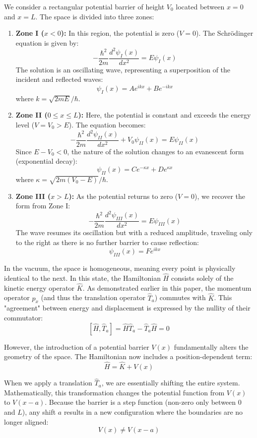 \documentclass{article}
\begin{document}
We consider a rectangular potential barrier of height $V_0$ located between $x = 0$ and $x = L$. The space is divided into three zones:

\begin{enumerate}
    \item \textbf{Zone I ($x < 0$):} In this region, the potential is zero ($V = 0$). The Schrödinger equation is given by:
    $$ -\frac{\hbar^2}{2m} \frac{d^2\psi_I(x)}{dx^2} = E\psi_I(x) $$
    The solution is an oscillating wave, representing a superposition of the incident and reflected waves:
    $$ \psi_I(x) = A e^{ikx} + B e^{-ikx} $$
    where $k = \sqrt{2mE}/\hbar$.

    \item \textbf{Zone II ($0 \leq x \leq L$):} Here, the potential is constant and exceeds the energy level ($V = V_0 > E$). The equation becomes:
    $$ -\frac{\hbar^2}{2m} \frac{d^2\psi_{II}(x)}{dx^2} + V_0\psi_{II}(x) = E\psi_{II}(x) $$
    Since $E - V_0 < 0$, the nature of the solution changes to an evanescent form (exponential decay):
    $$ \psi_{II}(x) = C e^{-\kappa x} + D e^{\kappa x} $$
    where $\kappa = \sqrt{2m(V_0 - E)}/\hbar$.

    \item \textbf{Zone III ($x > L$):} As the potential returns to zero ($V = 0$), we recover the form from Zone I:
    $$ -\frac{\hbar^2}{2m} \frac{d^2\psi_{III}(x)}{dx^2} = E\psi_{III}(x) $$
    The wave resumes its oscillation but with a reduced amplitude, traveling only to the right as there is no further barrier to cause reflection:
    $$ \psi_{III}(x) = F e^{ikx} $$
\end{enumerate}



In the vacuum, the space is homogeneous, meaning every point is physically identical to the next. In this state, the Hamiltonian $\hat{H}$ consists solely of the kinetic energy operator $\hat{K}$. As demonstrated earlier in this paper, the momentum operator $\hat{p}_x$ (and thus the translation operator $\hat{T}_a$) commutes with $\hat{K}$. This "agreement" between energy and displacement is expressed by the nullity of their commutator:
$$ [\hat{H}, \hat{T}_a] = \hat{H}\hat{T}_a - \hat{T}_a\hat{H} = 0 $$

However, the introduction of a potential barrier $V(x)$ fundamentally alters the geometry of the space. The Hamiltonian now includes a position-dependent term:
$$ \hat{H} = \hat{K} + V(x) $$

When we apply a translation $\hat{T}_a$, we are essentially shifting the entire system. Mathematically, this transformation changes the potential function from $V(x)$ to $V(x-a)$. Because the barrier is a step function (non-zero only between $0$ and $L$), any shift $a$ results in a new configuration where the boundaries are no longer aligned:
$$ V(x) \neq V(x-a) $$
\end{document}
